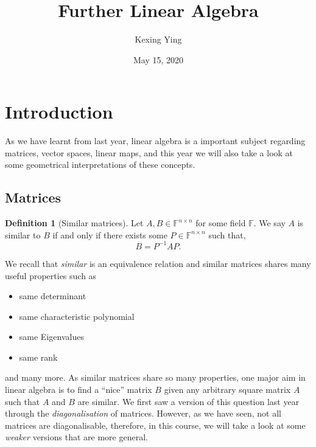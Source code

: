 \documentclass[
]{article}
\title{Further Linear Algebra}
\author{Kexing Ying}
\date{May 15, 2020}
\theoremstyle{definition}
\theoremstyle{definition}
\newtheorem{definition}{Definition}[section]
\begin{document}
\maketitle

{
\hypersetup{linkcolor=}
\setcounter{tocdepth}{2}
\tableofcontents
}
\newpage

\hypertarget{introduction}{%
\section{Introduction}\label{introduction}}

As we have learnt from last year, linear algebra is a important subject
regarding matrices, vector spaces, linear maps, and this year we will
also take a look at some geometrical interpretations of these concepts.

\hypertarget{matrices}{%
\subsection{Matrices}\label{matrices}}

\begin{definition} [Similar matrices]
  Let \(A, B \in \mathbb{F}^{n \times n}\) for some field \(\mathbb{F}\). 
  We say \(A\) is similar to \(B\) if and only if there exists some 
  \(P \in \mathbb{F}^{n \times n}\) such that, 
  \[B = P^{-1} A P.\]
\end{definition}

We recall that \emph{similar} is an equivalence relation and similar
matrices shares many useful properties such as

\begin{itemize}
  \item same determinant
  \item same characteristic polynomial
  \item same Eigenvalues
  \item same rank
\end{itemize}

and many more. As similar matrices share so many properties, one major
aim in linear algebra is to find a ``nice'' matrix \(B\) given any
arbitrary square matrix \(A\) such that \(A\) and \(B\) are similar. We
first saw a version of this question last year through the
\emph{diagonalisation} of matrices. However, as we have seen, not all
matrices are diagonalisable, therefore, in this course, we will take a
look at some \emph{weaker} versions that are more general.
\end{document}
